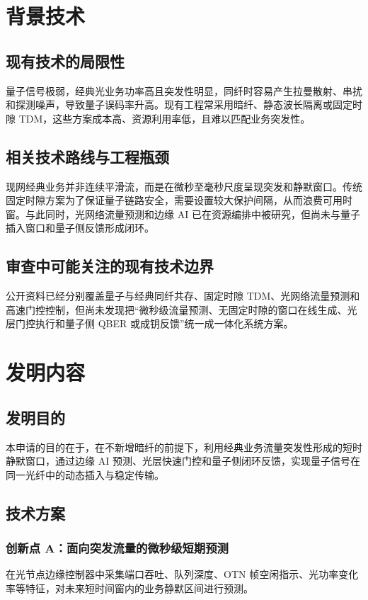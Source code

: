 ﻿\documentclass[12pt,a4paper]{article}
\begin{document}
\section{背景技术}
\subsection{现有技术的局限性}
量子信号极弱，经典光业务功率高且突发性明显，同纤时容易产生拉曼散射、串扰和探测噪声，导致量子误码率升高。现有工程常采用暗纤、静态波长隔离或固定时隙 TDM，这些方案成本高、资源利用率低，且难以匹配业务突发性。

\subsection{相关技术路线与工程瓶颈}
现网经典业务并非连续平滑流，而是在微秒至毫秒尺度呈现突发和静默窗口。传统固定时隙方案为了保证量子链路安全，需要设置较大保护间隔，从而浪费可用时窗。与此同时，光网络流量预测和边缘 AI 已在资源编排中被研究，但尚未与量子插入窗口和量子侧反馈形成闭环。

\subsection{审查中可能关注的现有技术边界}
公开资料已经分别覆盖量子与经典同纤共存、固定时隙 TDM、光网络流量预测和高速门控控制，但尚未发现把“微秒级流量预测、无固定时隙的窗口在线生成、光层门控执行和量子侧 QBER 或成钥反馈”统一成一体化系统方案。

\section{发明内容}
\subsection{发明目的}
本申请的目的在于，在不新增暗纤的前提下，利用经典业务流量突发性形成的短时静默窗口，通过边缘 AI 预测、光层快速门控和量子侧闭环反馈，实现量子信号在同一光纤中的动态插入与稳定传输。

\subsection{技术方案}
\subsubsection{创新点 A：面向突发流量的微秒级短期预测}
在光节点边缘控制器中采集端口吞吐、队列深度、OTN 帧空闲指示、光功率变化率等特征，对未来短时间窗内的业务静默区间进行预测。
\end{document}
